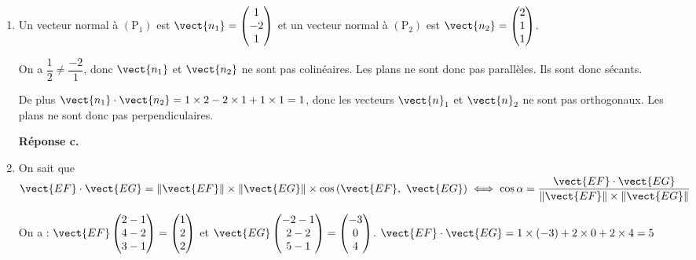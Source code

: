 \begin{enumerate}
	On a : $\vect{n}\cdot\vec{u} = 2 \times 1 - 1 \times 1 + 1 \times (-1) = 0$, donc $\vect{n}$ et $\vect{u}$ sont orthogonaux. Donc (P) et $(\Delta)$ sont parallèles.
	
	S'il existe un point commun à (P) et $(\Delta)$, alors $(\Delta)$ est incluse dans (P).
	
	$(\Delta)$ passe par le point de coordonnées $(2~;~4~;~1)$. Or $2 \times 2 - 4 + 1 - 1 = 0$, donc ce point est un point du plan (P). La droite $(\Delta)$ est donc incluse dans le plan (P).
	
	\textbf{Réponse b.}
	\item Un vecteur normal à $\left(\text{P}_1\right)$ est $\vect{n_1} = \begin{pmatrix}1\\-2\\1\end{pmatrix}$ et un vecteur normal à $\left(\text{P}_2\right)$ est $\vect{n_2} = \begin{pmatrix}2\\1\\1\end{pmatrix}$.
	
	On a $\dfrac{1}{2} \neq \dfrac{-2}{1}$, donc $\vect{n_1}$ et $\vect{n_2}$ ne sont pas colinéaires. Les plans ne sont donc pas parallèles. Ils sont donc sécants.
	
	De plus $\vect{n_1} \cdot \vect{n_2} = 1 \times 2 - 2 \times 1 + 1 \times 1 = 1$, donc les vecteurs $\vect{n}_1$ et $\vect{n}_2$ ne sont pas orthogonaux. Les plans ne sont donc pas perpendiculaires.
	
	\textbf{Réponse c.}
	\item On sait que $\vect{EF} \cdot \vect{EG} = \left\|\vect{EF}\right\| \times \left\|\vect{EG}\right\| \times \cos \left(\vect{EF},~\vect{EG}\right) \iff \cos \alpha = \dfrac{\vect{EF} \cdot \vect{EG}}{\left\|\vect{EF}\right\| \times \left\|\vect{EG}\right\|}$
	
On a : $\vect{EF}\begin{pmatrix}2-1\\4-2\\3-1\end{pmatrix} = \begin{pmatrix}1\\2\\2\end{pmatrix}$ et $\vect{EG}\begin{pmatrix}-2-1\\2-2\\5-1\end{pmatrix} = \begin{pmatrix}-3\\0\\4\end{pmatrix}$.
	$\vect{EF} \cdot \vect{EG} = 1 \times (-3) + 2 \times 0 + 2 \times 4 = 5$
	

\end{enumerate}
